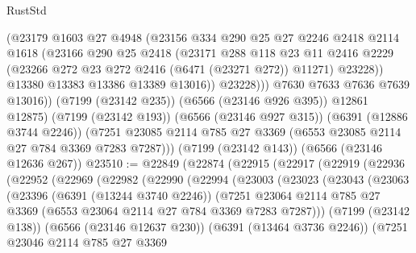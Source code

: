 \begin{lexlean}{RustStd}
\begin{coremodule}
{\begin{coremodule}
{{{{{{{{{{{{{{{{{{{{{{{{{{                  (@23179
                    @1603
                    @27
                    @4948
                    (@23156
                      @334
                      @290
                      @25
                      @27
                      @2246
                      @2418
                      @2114
                      @1618
                      (@23166
                        @290
                        @25
                        @2418
                        (@23171
                          @288
                          @118
                          @23
                          @11
                          @2416
                          @2229
                          (@23266 @272 @23 @272 @2416 (@6471 (@23271 @272)) @11271)
                          @23228))
                      @13380
                      @13383
                      @13386
                      @13389
                      @13016))
                  @23228)))
            @7630
            @7633
            @7636
            @7639
            @13016))
        (@7199 (@23142 @235))
        (@6566 (@23146 @926 @395))
        @12861
        @12875)
      (@7199 (@23142 @193))
      (@6566 (@23146 @927 @315))
      (@6391 (@12886 @3744 @2246))
      (@7251 @23085 @2114 @785 @27 @3369 (@6553 @23085 @2114 @27 @784 @3369 @7283 @7287)))
    (@7199 (@23142 @143))
    (@6566 (@23146 @12636 @267))
@23510 := @22849
    (@22874
      (@22915
        (@22917
          (@22919
            (@22936
              (@22952
                (@22969
                  (@22982
                    (@22990
                      (@22994
                        (@23003
                          (@23023
                            (@23043
                              (@23063
                                (@23396
                                  (@6391 (@13244 @3740 @2246))
                                  (@7251
                                    @23064
                                    @2114
                                    @785
                                    @27
                                    @3369
                                    (@6553 @23064 @2114 @27 @784 @3369 @7283 @7287)))
                                (@7199 (@23142 @138))
                                (@6566 (@23146 @12637 @230))
                                (@6391 (@13464 @3736 @2246))
                                (@7251
                                  @23046
                                  @2114
                                  @785
                                  @27
                                  @3369
}}}}}}}}}}}}}}}}}}}}}}}}}}
\end{coremodule}}
\end{coremodule}
\end{lexlean}
